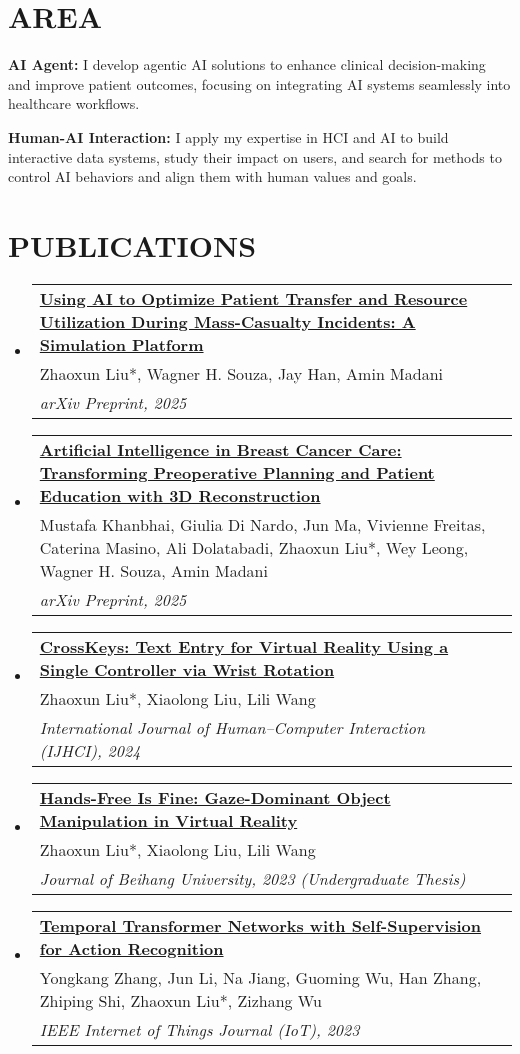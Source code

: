 \documentclass[letterpaper,11pt]{article}
\makeatletter
\newcommand{\publication}[3]{
  \vspace{-2pt}\item
    \begin{tabular*}{1.0\textwidth}[t]{l@{\extracolsep{\fill}}r}
    \textbf{\small{#1}} \\ 
    {#3} \\
    \textit{#2} \\
    \end{tabular*}\vspace{-7pt}
}
\newcommand{\resumeSubHeadingListStart}{\begin{itemize}[leftmargin=0.0in, label={}]}
\newcommand{\resumeSubHeadingListEnd}{\end{itemize}}
\makeatother
\begin{document}
\vspace{-10pt}
\section{AREA}
\textbf{\small{AI Agent}:} I develop agentic AI solutions to enhance clinical decision-making and improve patient outcomes, focusing on integrating AI systems seamlessly into healthcare workflows.

\textbf{\small{Human-AI Interaction}:} I apply my expertise in HCI and AI to build interactive data systems, study their impact on users, and search for methods to control AI behaviors and align them with human values and goals.

\section{PUBLICATIONS}
    \resumeSubHeadingListStart
        \publication{\href{https://arxiv.org/abs/2509.08756}{Using AI to Optimize Patient Transfer and Resource Utilization During Mass-Casualty Incidents: A Simulation Platform}}{arXiv Preprint, 2025}{Zhaoxun Liu*, Wagner H. Souza, Jay Han, Amin Madani}
        \publication{\href{https://arxiv.org/abs/2509.12242}{Artificial Intelligence in Breast Cancer Care: Transforming Preoperative Planning and Patient Education with 3D Reconstruction}}{arXiv Preprint, 2025}{Mustafa Khanbhai, Giulia Di Nardo, Jun Ma, Vivienne Freitas, Caterina Masino, Ali Dolatabadi, Zhaoxun Liu*, Wey Leong, Wagner H. Souza, Amin Madani}
        \publication{\href{https://doi.org/10.1080/10447318.2024.2358456}{CrossKeys: Text Entry for Virtual Reality Using a Single Controller via Wrist Rotation}}{International Journal of Human–Computer Interaction (IJHCI), 2024}{Zhaoxun Liu*, Xiaolong Liu, Lili Wang}
        \publication{\href{https://lorenz.fun/files/hands-free-is-fine.pdf}{Hands-Free Is Fine: Gaze-Dominant Object Manipulation in Virtual Reality}}{Journal of Beihang University, 2023 (Undergraduate Thesis)}{Zhaoxun Liu*, Xiaolong Liu, Lili Wang}
        \publication{\href{https://doi.org/10.1109/JIOT.2023.3257992}{Temporal Transformer Networks with Self-Supervision for Action Recognition}}{IEEE Internet of Things Journal (IoT), 2023}{Yongkang Zhang, Jun Li, Na Jiang, Guoming Wu, Han Zhang, Zhiping Shi, Zhaoxun Liu*, Zizhang Wu}
    \resumeSubHeadingListEnd
    
\vspace{-5pt}
\end{document}
